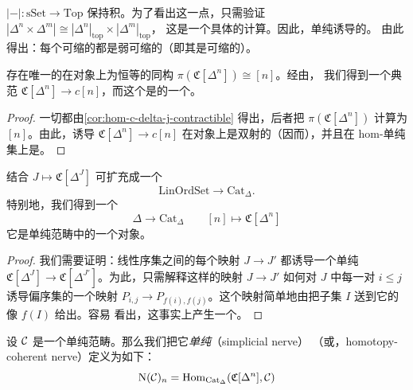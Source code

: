 \begin{remark}\label{rem:realization-preserves-products}
\trFunctor{} $|-|\colon \mathrm{sSet} \to \mathrm{Top}$ 保持积。为了看出这一点，只需验证
$|\Delta^n \times \Delta^m| \cong |\Delta^n|_{\mathrm{top}} \times |\Delta^m|_{\mathrm{top}}$，
这是一个具体的计算。因此，单纯\trHomotopy{}诱导\trGeometricRealization{}的\trHomotopy{}。
由此得出：每个可缩的\trSimplicialSet{}都是弱可缩的（即其\trGeometricRealization{}是可缩的）。
\end{remark}

\begin{lemma}\label{lem:pi-c-delta-n}
存在唯一的在对象上为恒等的同构 $\pi(\mathfrak{C}[\Delta^n]) \cong [n]$。经由\trAdjunction{}，
我们得到一个典范\trFunctor{} $\mathfrak{C}[\Delta^n] \to c[n]$，而这个\trFunctor{}是\trSimplicialCategory{}的一个\trWeakEquivalence{}。
\end{lemma}

\begin{proof}
一切都由\cref{cor:hom-c-delta-j-contractible} 得出，后者把
$\pi(\mathfrak{C}[\Delta^n])$ 计算为 $[n]$。由此，诱导\trFunctor{}%
$\mathfrak{C}[\Delta^n] \to c[n]$ 在对象上是双射的（因而\trWeaklyEssentiallySurjective{}），并且在
hom-单纯集上是\trWeakEquivalence{}。
\end{proof}

\begin{lemma}\label{lem:c-delta-j-functor}
结合 $J \mapsto \mathfrak{C}[\Delta^J]$ 可扩充成一个\trFunctor{}%
\[
\mathrm{LinOrdSet} \to \mathrm{Cat}_{\Delta}.
\]
特别地，我们得到一个\trFunctor{}%
\[
\Delta \to \mathrm{Cat}_{\Delta} \qquad [n] \mapsto \mathfrak{C}[\Delta^n]
\]
它是单纯\trEnrichment{}范畴中的一个\trCosimplicial{}对象。
\end{lemma}

\begin{proof}
我们需要证明：线性序集之间的每个映射 $J \to J'$ 都诱导一个单纯\trEnrichment{}\trFunctor{}%
$\mathfrak{C}[\Delta^J] \to \mathfrak{C}[\Delta^{J'}]$。为此，只需解释这样的映射
$J \to J'$ 如何对 $J$ 中每一对 $i \le j$ 诱导偏序集的一个映射
$P_{i,j} \to P_{f(i), f(j)}$。这个映射简单地由把子集 $I$ 送到它的像 $f(I)$ 给出。容易
看出，这事实上产生一个\trFunctor{}。
\end{proof}

\begin{definition}\label{def:simplicial-nerve}
设 $\mathcal{C}$ 是一个单纯\trEnrichment{}范畴。那么我们把它\emph{单纯\trNerve{}}（simplicial nerve）
（或\trCoherentNerve{}，homotopy-coherent nerve）定义为如下\trSimplicialSet{}：
\[
\mathrm{N}(\mathcal{C})_n = \mathrm{Hom}_{\mathrm{Cat}_{\Delta}}(\mathfrak{C}[\Delta^n], \mathcal{C})
\]
\end{definition}

